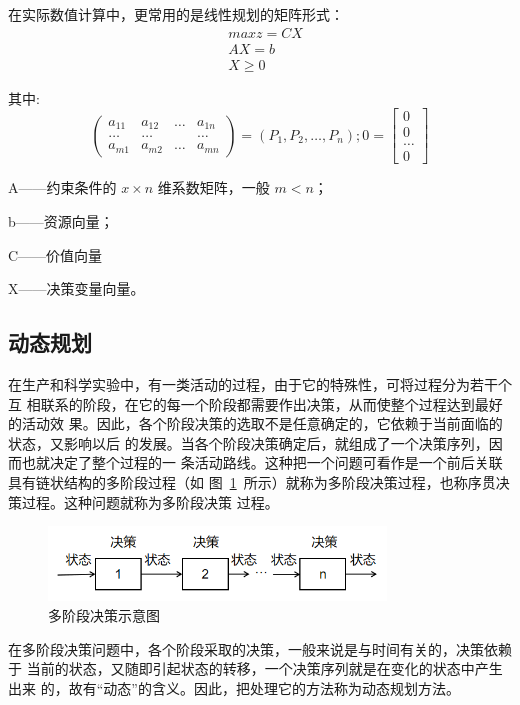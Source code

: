     在实际数值计算中，更常用的是线性规划的矩阵形式：
$$
\begin{aligned}
    &max z=CX \\
    &AX = b\\
    &X \ge 0
\end{aligned}
$$

其中:
$$
\begin{pmatrix}
    a_{11}  & a_{12} &… &a_{1n} \\
     … &  …& &…\\
     a_{m1} & a_{m2} &…&a_{mn}
    \end{pmatrix}=\left ( P_1,P_2,…,P_n \right ) 
    ;0=\begin{bmatrix}
     0\\
     0\\
     …\\
    0
\end{bmatrix}
$$



A——约束条件的 $x \times n$ 维系数矩阵，一般 $m < n$；

b——资源向量；

C——价值向量

X——决策变量向量。


\subsection{动态规划}
在生产和科学实验中，有一类活动的过程，由于它的特殊性，可将过程分为若干个互
相联系的阶段，在它的每一个阶段都需要作出决策，从而使整个过程达到最好的活动效
果。因此，各个阶段决策的选取不是任意确定的，它依赖于当前面临的状态，又影响以后
的发展。当各个阶段决策确定后，就组成了一个决策序列，因而也就决定了整个过程的一
条活动路线。这种把一个问题可看作是一个前后关联具有链状结构的多阶段过程（如
图~\ref{fig22}~所示）就称为多阶段决策过程，也称序贯决策过程。这种问题就称为多阶段决策
过程。
\begin{figure}[h]
    \centering
    \includegraphics[width=0.80\textwidth]{figs/chap02/dp.png}
    \caption{多阶段决策示意图}
    \label{fig22}
\end{figure}

在多阶段决策问题中，各个阶段采取的决策，一般来说是与时间有关的，决策依赖于
当前的状态，又随即引起状态的转移，一个决策序列就是在变化的状态中产生出来
的，故有“动态”的含义。因此，把处理它的方法称为动态规划方法。

